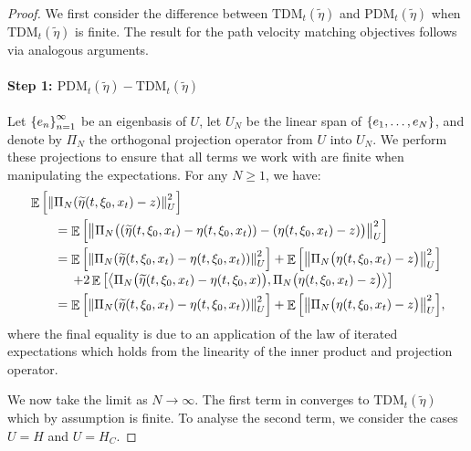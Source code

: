 \begin{proof}
  We first consider the difference between \(\mathrm{TDM}_{t}(\widetilde{\eta})\) and \(\mathrm{PDM}_{t}(\widetilde{\eta})\) when \(\mathrm{TDM}_{t}(\widetilde{\eta})\) is finite. The result for the path velocity matching objectives follows via analogous arguments.
  \paragraph{Step 1: \(\mathrm{PDM}_{t}(\widetilde{\eta}) - \mathrm{TDM}_{t}(\widetilde{\eta})\)}

  Let \(\qty{e_{n}}_{n=1}^{\infty}\) be an eigenbasis of \(U\), let \(U_{N}\) be the linear span of \(\qty{e_{1}, \ldots, e_{N}}\), and denote by \(\Pi_{N}\) the orthogonal projection operator from \(U\) into \(U_{N}\). We perform these projections to ensure that all terms we work with are finite when manipulating the expectations. For any \(N \geq 1\), we have:
  \begin{align}
    &\mathop{\mathbb{E}}\qty[ \norm{\Pi_{N}\qty(\widetilde{\eta}(t, \xi_{0}, x_{t}) - z)}_{U}^{2} ] \label{eqn:lhs}\\
    &\qquad= \mathop{\mathbb{E}}\qty[ \norm{\Pi_{N}\big(\qty(\widetilde{\eta}(t, \xi_{0}, x_{t}) - \eta(t, \xi_{0}, x_{t})) - (\eta(t, \xi_{0}, x_{t}) - z)\big)}_{U}^{2} ] \notag\\
    &\qquad= \mathop{\mathbb{E}}\qty[\norm{\Pi_{N}( \widetilde{\eta}(t, \xi_{0}, x_{t}) - \eta(t, \xi_{0}, x_{t}))}_{U}^{2}] + \mathop{\mathbb{E}}\qty[\norm{\Pi_{N} \big(\eta(t, \xi_{0}, x_{t}) - z\big)}_{U}^{2}]\notag\\[-0.25em]
    &\qquad\mathrel{\phantom{=}}\,+ 2 \mathop{\mathbb{E}}\qty[ \ev{ \Pi_{N}\big(\widetilde{\eta}(t, \xi_{0}, x_{t}) - \eta(t, \xi_{0}, x)\big), \Pi_{N} \big(\eta(t, \xi_{0}, x_{t}) - z\big)} ] \notag\\
    &\qquad= \mathop{\mathbb{E}}\qty[\norm{\Pi_{N}( \widetilde{\eta}(t, \xi_{0}, x_{t}) - \eta(t, \xi_{0}, x_{t}))}_{U}^{2}] + \mathop{\mathbb{E}}\qty[\norm{\Pi_{N} \big(\eta(t, \xi_{0}, x_{t}) - z\big)}_{U}^{2}], \label{eqn:lossn}
  \end{align}
  where the final equality is due to an application of the law of iterated expectations which holds from the linearity of the inner product and projection operator.

  We now take the limit as \(N \to \infty\). The first term in  converges to \(\mathrm{TDM}_{t}(\widetilde{\eta})\) which by assumption is finite. To analyse the second term, we consider the cases \(U = H\) and \(U = H_{C}\).


\end{proof}
